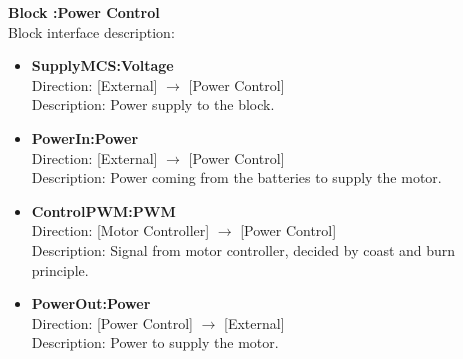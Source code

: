 \textbf{Block :Power Control}\\
Block interface description:
\begin{itemize}
	\item \textbf{SupplyMCS:Voltage}\\
	Direction: [External] $\rightarrow$ [Power Control]\\
	Description: Power supply to the block.
	\item \textbf{PowerIn:Power}\\
	Direction: [External] $\rightarrow$ [Power Control]\\
	Description: Power coming from the batteries to supply the motor.
	\item \textbf{ControlPWM:PWM}\\
	Direction: [Motor Controller] $\rightarrow$ [Power Control]\\
	Description: Signal from motor controller, decided by  coast and burn principle. 
	\item \textbf{PowerOut:Power}\\
	Direction: [Power Control] $\rightarrow$ [External]\\
	Description: Power to supply the motor.
\end{itemize}


